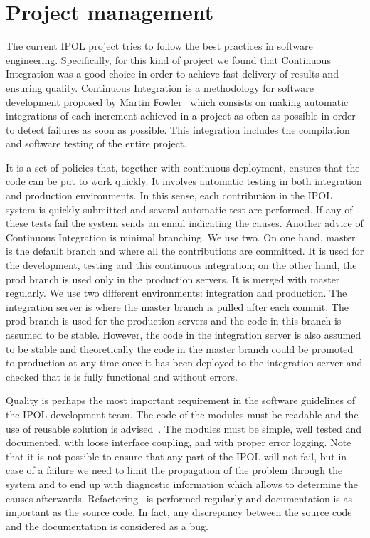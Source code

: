 
\section{Project management}
\label{sec:methodology}
The current IPOL project tries to follow the best practices in software engineering. Specifically, for this kind of project we found that Continuous Integration was a good choice in order to achieve fast delivery of results and ensuring quality. Continuous Integration is a methodology for software development proposed by Martin Fowler~\cite{fowler2006continuous} which consists on making automatic integrations of each increment achieved in a project as often as possible in order to detect failures as soon as possible. This integration includes the compilation and software testing of the entire project.

It is a set of policies that, together with continuous deployment, ensures that the code can be put to work quickly. It involves automatic testing in both integration and production environments. In this sense, each contribution in the IPOL system is quickly submitted and several automatic test are performed. If any of these tests fail the system sends an email indicating the causes.
%
Another advice of Continuous Integration is minimal branching. We use two. On one hand, master is the default branch and where all the contributions are committed. It is used for the development, testing and this continuous integration; on the other hand, the prod branch is used only in the production servers. It is merged with master regularly.
%
We use two different environments: integration and production. The integration server is where the master branch is pulled after each commit. The prod branch is used for the production servers and the code in this branch is assumed to be stable. However, the code in the integration server is also assumed to be stable and theoretically the code in the master branch could be promoted to production at any time once it has been deployed to the integration server and checked that is is fully functional and without errors. 

Quality is perhaps the most important requirement in the software guidelines of the IPOL development team. The code of the modules must be readable and the use of reusable solution is advised~\cite{GoF}. The modules must be simple, well tested and documented, with loose interface coupling, and with proper error logging. Note that it is not possible to ensure that any part of the IPOL will not fail, but in case of a failure we need to limit the propagation of the problem through the system and to end up with diagnostic information which allows to determine the causes afterwards.
%
Refactoring~\cite{fowler1999refactoring} is performed regularly and documentation is as important as the source code. In fact, any discrepancy between the source code and the documentation is considered as a bug.

